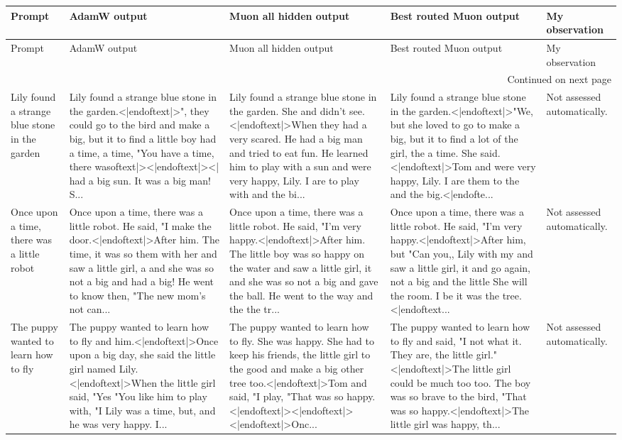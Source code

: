 \begin{longtable}{lllll}
\toprule
Prompt & AdamW output & Muon all hidden output & Best routed Muon output & My observation \\
\midrule
\endfirsthead
\toprule
Prompt & AdamW output & Muon all hidden output & Best routed Muon output & My observation \\
\midrule
\endhead
\midrule
\multicolumn{5}{r}{Continued on next page} \\
\midrule
\endfoot
\bottomrule
\endlastfoot
Lily found a strange blue stone in the garden & Lily found a strange blue stone in the garden.<|endoftext|>", they could go to the bird and make a big, but it to find a little boy had a time, a time, "You have a time, there wasoftext|><|endoftext|><| had a big sun. It was a big man! S... & Lily found a strange blue stone in the garden. She and didn't see.<|endoftext|>When they had a very scared. He had a big man and tried to eat fun. He learned him to play with a sun and were very happy, Lily. I are to play with and the bi... & Lily found a strange blue stone in the garden.<|endoftext|>"We, but she loved to go to make a big, but it to find a lot of the girl, the a time. She said.<|endoftext|>Tom and were very happy, Lily. I are them to the and the big.<|endofte... & Not assessed automatically. \\
Once upon a time, there was a little robot & Once upon a time, there was a little robot. He said, "I make the door.<|endoftext|>After him. The time, it was so them with her and saw a little girl, a and she was so not a big and had a big! He went to know then, "The new mom's not can... & Once upon a time, there was a little robot. He said, "I'm very happy.<|endoftext|>After him. The little boy was so happy on the water and saw a little girl, it and she was so not a big and gave the ball. He went to the way and the the tr... & Once upon a time, there was a little robot. He said, "I'm very happy.<|endoftext|>After him, but "Can you,, Lily with my and saw a little girl, it and go again, not a big and the little She will the room. I be it was the tree.<|endoftext... & Not assessed automatically. \\
The puppy wanted to learn how to fly & The puppy wanted to learn how to fly and him.<|endoftext|>Once upon a big day, she said the little girl named Lily.<|endoftext|>When the little girl said, "Yes "You like him to play with, "I Lily was a time, but, and he was very happy. I... & The puppy wanted to learn how to fly. She was happy. She had to keep his friends, the little girl to the good and make a big other tree too.<|endoftext|>Tom and said, "I play, "That was so happy.<|endoftext|><|endoftext|><|endoftext|>Onc... & The puppy wanted to learn how to fly and said, "I not what it. They are, the little girl."<|endoftext|>The little girl could be much too too. The boy was so brave to the bird, "That was so happy.<|endoftext|>The little girl was happy, th... & Not assessed automatically. \\
\end{longtable}
